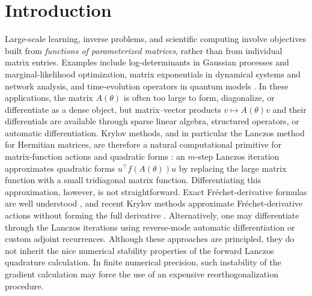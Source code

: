 \documentclass{article}
\begin{document}
\section{Introduction}
Large-scale learning, inverse problems, and scientific computing involve objectives built from \emph{functions of 
parameterized matrices}, rather than from individual matrix entries. Examples include log-determinants in Gaussian processes and marginal-likelihood optimization, matrix exponentials in dynamical systems and network analysis, and time-evolution operators in quantum models \citep{rasmussen2006gaussian,dong2017scalable,immer2021scalable,saad1992exponential,hochbruck1997krylov,benzi2020,banchi2023learning}. In these applications, the matrix \(A(\theta)\) is often too large to form, diagonalize, or differentiate as a dense object, but matrix--vector products \(v\mapsto A(\theta)v\) and their differentials are available through sparse linear algebra, structured operators, or automatic differentiation. Krylov methods, and in particular the Lanczos method for Hermitian matrices, are therefore a natural computational primitive for matrix-function actions and quadratic forms \citep{gallopoulos1992parabolic,beckermann2009faber,ubaru2017fast,chen2023krylov,davies2021krylov}: an \(m\)-step Lanczos iteration approximates quadratic forms $u^\top f(A(\theta))u$
by replacing the large matrix function with a small tridiagonal matrix function. Differentiating this approximation, however, is not straightforward. Exact Fr\'echet-derivative formulas are well understood \citep{najfeld1995,almohy2009}, and recent Krylov methods approximate Fr\'echet-derivative actions without forming the full derivative \citep{kressner2019,kandolf2023,crouzeix2020,kressner2026}. Alternatively, one may differentiate through the Lanczos iterations using reverse-mode automatic differentiation or custom adjoint recurrences. Although these approaches are principled, 
they do not inherit the nice numerical stability properties of the forward Lanczos quadrature calculation. In finite numerical precision, such instability of the gradient calculation may force the use of an expensive reorthogonalization procedure.
\end{document}

